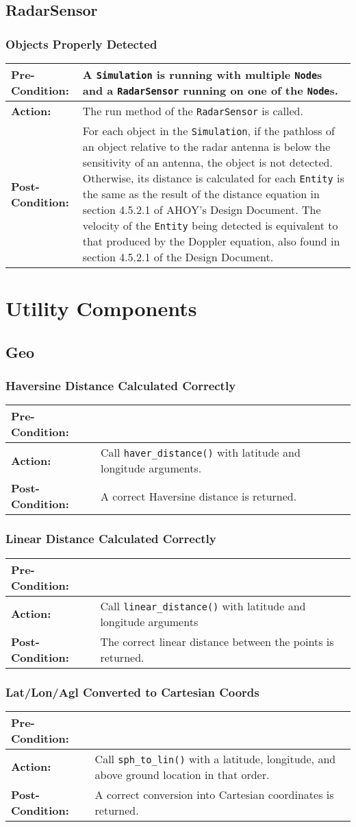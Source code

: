 \documentclass[titlepage]{article}
\newcommand{\testcase}[3]{
    \begin{center}
    \begin{tabular}{| l | p{0.7\textwidth}|}
        \hline
        \rowcolor[gray]{0.8}\textbf{Pre-Condition:} & #1 \\ \hline
        \textbf{Action:} & #2 \\ \hline
        \rowcolor[gray]{0.8}\textbf{Post-Condition:} & #3 \\ \hline
    \end{tabular}
    \end{center}
}
\begin{document}
\subsection{RadarSensor}
\subsubsection{Objects Properly Detected}
\testcase{A \texttt{Simulation} is running with multiple \texttt{Node}s and a \texttt{RadarSensor} running on one of the \texttt{Node}s.}{The run method of the \texttt{RadarSensor} is called.}{For each object in the \texttt{Simulation}, if the pathloss of an object relative to the radar antenna is below the sensitivity of an antenna, the object is not detected.  Otherwise, its distance is calculated for each \texttt{Entity} is the same as the result of the distance equation in section 4.5.2.1 of AHOY's Design Document. The velocity of the \texttt{Entity} being detected is equivalent to that produced by the Doppler equation, also found in section 4.5.2.1 of the Design Document.}

\section{Utility Components}
\subsection{Geo}
\subsubsection{Haversine Distance Calculated Correctly}
\testcase{}{Call \texttt{haver\_distance()} with latitude and longitude arguments.}{A correct Haversine distance is returned.}

\subsubsection{Linear Distance Calculated Correctly}
\testcase{}{Call \texttt{linear\_distance()} with latitude and longitude arguments}{The correct linear distance between the points is returned.}

\subsubsection{Lat/Lon/Agl Converted to Cartesian Coords}
\testcase{}{Call \texttt{sph\_to\_lin()} with a latitude, longitude, and above ground location in that order.}{A correct conversion into Cartesian coordinates is returned.}
\end{document}
